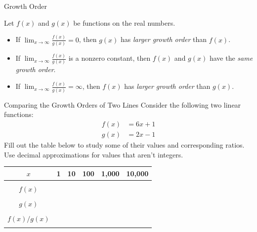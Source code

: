 \begin{definition}{Growth Order}\label{tomahto}

Let $f(x)$ and $g(x)$ be functions on the real numbers. 
\begin{itemize}
\item If $\lim_{x\rightarrow \infty}\frac{f(x)}{g(x)}=0$, then $g(x)$ has \emph{larger growth order} than $f(x)$. 
\item If $\lim_{x\rightarrow \infty}\frac{f(x)}{g(x)}$ is a nonzero constant, then $f(x)$ and $g(x)$ have the \emph{same growth order}. 
\item If $\lim_{x\rightarrow \infty}\frac{f(x)}{g(x)}=\infty$, then $f(x)$ has \emph{larger growth order} than $g(x)$. 
\end{itemize}
\end{definition}
\begin{exercise}{Comparing the Growth Orders of Two Lines \Coffeecup \Coffeecup}
Consider the following two linear functions: \begin{align*}
f(x)&=6x+1\\
g(x)&=2x-1
\end{align*}
Fill out the table below to study some of their values and corresponding ratios.  Use decimal approximations for values that aren't integers.  \begin{center}
\begin{tabular}{|c||c|c|c|c|c|} \hline
$x$ & 1 & 10 & 100 & 1,000 & 10,000 \\ \hline
& & & & & \\
$f(x)$ & & & & & \\
& & & & & \\
$g(x)$ & & & & & \\
& & & & & \\
$f(x)/g(x) $ & & & & & \\
& & & & & \\ \hline
\end{tabular}
\end{center}
\end{exercise}
